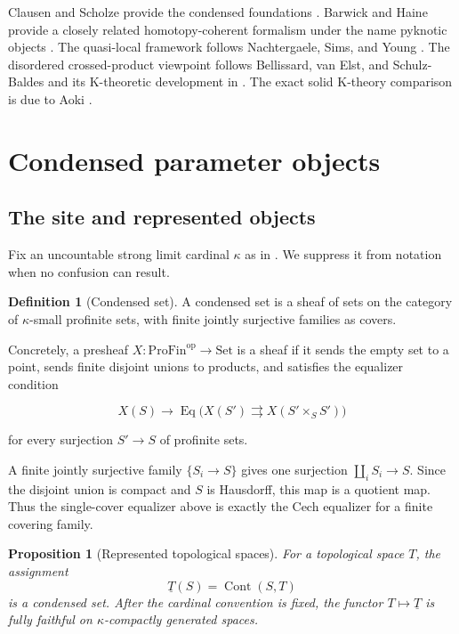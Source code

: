 \documentclass[12pt]{article}
\newtheorem{proposition}[theorem]{Proposition}
\theoremstyle{definition}
\newtheorem{definition}[theorem]{Definition}
\theoremstyle{remark}
\newcommand{\ProFin}{\mathrm{ProFin}}
\newcommand{\Cont}{\operatorname{Cont}}
\newcommand{\Eq}{\operatorname{Eq}}
\begin{document}
Clausen and Scholze provide the condensed foundations
\cite{ClausenScholze}.  Barwick and Haine provide a closely related homotopy-coherent
formalism under the name pyknotic objects \cite{BarwickHaine}.  The quasi-local
framework follows Nachtergaele, Sims, and Young \cite{NSY}.  The disordered
crossed-product viewpoint follows Bellissard, van Elst, and Schulz-Baldes
\cite{Bellissard} and its K-theoretic development in
\cite{BourneKellendonkRennie,Kellendonk}.  The exact solid K-theory comparison is due
to Aoki \cite{Aoki}.

\section{Condensed parameter objects}

\subsection{The site and represented objects}

Fix an uncountable strong limit cardinal $\kappa$ as in
\cite{ClausenScholze}.  We suppress it from notation when no confusion can result.

\begin{definition}[Condensed set]
A condensed set is a sheaf of sets on the category of $\kappa$-small profinite sets,
with finite jointly surjective families as covers.
\end{definition}

Concretely, a presheaf $X:\ProFin^{\mathrm{op}}\to\mathrm{Set}$ is a sheaf if it
sends the empty set to a point, sends finite disjoint unions to products, and
satisfies the equalizer condition

\[
X(S)\longrightarrow
\Eq\bigl(X(S')\rightrightarrows X(S'\times_S S')\bigr)
\]

for every surjection $S'\to S$ of profinite sets.

A finite jointly surjective family $\{S_i\to S\}$ gives one surjection
$\coprod_iS_i\to S$.  Since the disjoint union is compact and $S$ is Hausdorff, this
map is a quotient map.  Thus the single-cover equalizer above is exactly the Cech
equalizer for a finite covering family.

\begin{proposition}[Represented topological spaces]
For a topological space $T$, the assignment
\[
\underline T(S)=\Cont(S,T)
\]
is a condensed set.  After the cardinal convention is fixed, the functor
$T\mapsto\underline T$ is fully faithful on $\kappa$-compactly generated spaces.
\end{proposition}
\end{document}

